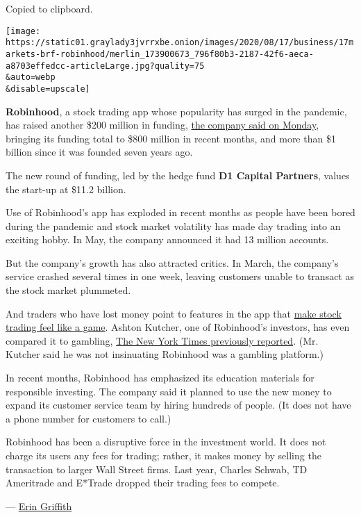 Copied to clipboard.

\texttt{[image: https://static01.graylady3jvrrxbe.onion/images/2020/08/17/business/17markets-brf-robinhood/merlin\_173900673\_796f80b3-2187-42f6-aeca-a8703effedcc-articleLarge.jpg?quality=75\\\&auto=webp\\\&disable=upscale]}

\textbf{Robinhood}, a stock trading app whose popularity has surged in
the pandemic, has raised another \$200 million in funding,
\href{https://blog.robinhood.com/news/2020/8/17/series-g}{the company
said on Monday}, bringing its funding total to \$800 million in recent
months, and more than \$1 billion since it was founded seven years ago.

The new round of funding, led by the hedge fund \textbf{D1 Capital
Partners}, values the start-up at \$11.2 billion.

Use of Robinhood's app has exploded in recent months as people have been
bored during the pandemic and stock market volatility has made day
trading into an exciting hobby. In May, the company announced it had 13
million accounts.

But the company's growth has also attracted critics. In March, the
company's service crashed several times in one week, leaving customers
unable to transact as the stock market plummeted.

And traders who have lost money point to features in the app that
\href{https://www.nytimes3xbfgragh.onion/2020/07/08/technology/robinhood-risky-trading.html}{make
stock trading feel like a game}. Ashton Kutcher, one of Robinhood's
investors, has even compared it to gambling,
\href{https://www.nytimes3xbfgragh.onion/2020/07/08/technology/robinhood-risky-trading.html}{The
New York Times previously reported}. (Mr. Kutcher said he was not
insinuating Robinhood was a gambling platform.)

In recent months, Robinhood has emphasized its education materials for
responsible investing. The company said it planned to use the new money
to expand its customer service team by hiring hundreds of people. (It
does not have a phone number for customers to call.)

Robinhood has been a disruptive force in the investment world. It does
not charge its users any fees for trading; rather, it makes money by
selling the transaction to larger Wall Street firms. Last year, Charles
Schwab, TD Ameritrade and E*Trade dropped their trading fees to compete.

--- \href{https://www.nytimes3xbfgragh.onion/by/erin-griffith}{Erin
Griffith}

